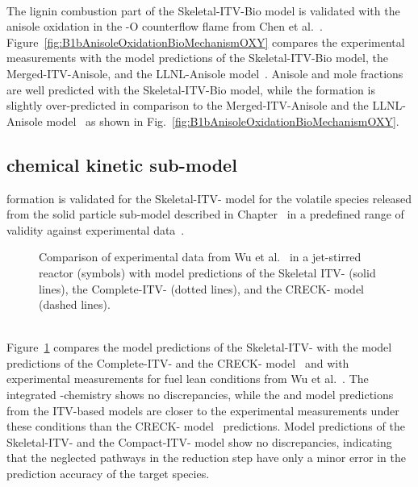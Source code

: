 \begin{refsection}
\\
The lignin combustion part of the Skeletal-ITV-Bio model is validated with the anisole oxidation in the -O counterflow flame from Chen et al.~\cite{Chen2022}. Figure~\ref{fig:B1bAnisoleOxidationBioMechanismOXY} compares the experimental measurements with the model predictions of the Skeletal-ITV-Bio model, the Merged-ITV-Anisole, and the LLNL-Anisole model~\cite{Wagnon2018}. Anisole and  mole fractions are well predicted with the Skeletal-ITV-Bio model, while the  formation is slightly over-predicted in comparison to the Merged-ITV-Anisole and the LLNL-Anisole model~\cite{Wagnon2018} as shown in Fig.~\ref{fig:B1bAnisoleOxidationBioMechanismOXY}.


\subsection{ chemical kinetic sub-model}
 formation is validated for the Skeletal-ITV- model for the volatile species released from the solid particle sub-model described in Chapter~ in a predefined range of validity against experimental data~\cite{Wu2022}.
\begin{figure}[t]
  \centering
  \hfill
  \hfill
  \caption{Comparison of experimental data from Wu et al.~\cite{Wu2022} in a jet-stirred reactor (symbols) with model predictions of the Skeletal ITV- (solid lines), the Complete-ITV- (dotted lines), and the CRECK- model~\cite{Shamooni2021} (dashed lines).}
  \label{fig:B1bNOxWuValidation}
\end{figure}
\\
Figure~\ref{fig:B1bNOxWuValidation} compares the model predictions of the Skeletal-ITV- with the model predictions of the Complete-ITV- and the CRECK- model~\cite{Shamooni2021} and with experimental measurements for fuel lean conditions from Wu et al.~\cite{ Wu2022}. The integrated -chemistry shows no discrepancies, while the  and  model predictions from the ITV-based models are closer to the experimental measurements under these conditions than the CRECK- model~\cite{Shamooni2021} predictions. Model predictions of the Skeletal-ITV- and the Compact-ITV- model show no discrepancies, indicating that the neglected pathways in the reduction step have only a minor error in the prediction accuracy of the target species.




\Acknowledgement

\renewcommand{\bibname}{References}
\printbibliography[heading=subbibliography]

\end{refsection}
